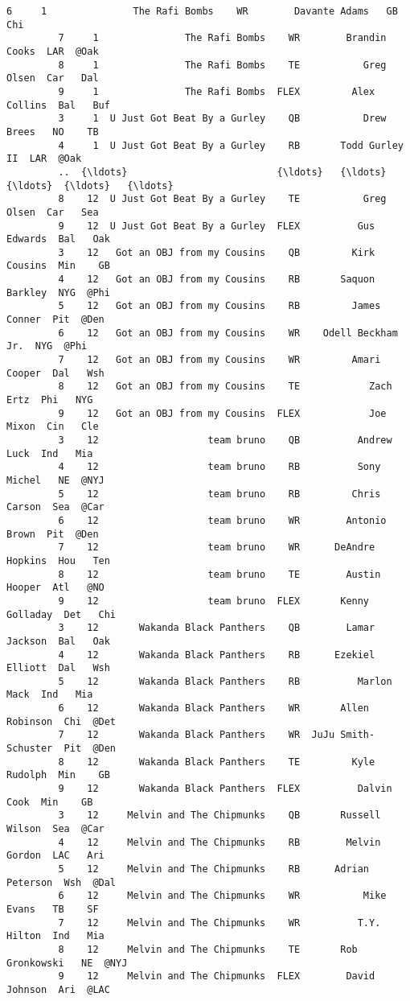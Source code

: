 \documentclass[11pt]{article}
\begin{document}
\begin{Verbatim}[commandchars=\\\{\}]
         6     1               The Rafi Bombs    WR        Davante Adams   GB   Chi   
         7     1               The Rafi Bombs    WR        Brandin Cooks  LAR  @Oak   
         8     1               The Rafi Bombs    TE           Greg Olsen  Car   Dal   
         9     1               The Rafi Bombs  FLEX         Alex Collins  Bal   Buf   
         3     1  U Just Got Beat By a Gurley    QB           Drew Brees   NO    TB   
         4     1  U Just Got Beat By a Gurley    RB       Todd Gurley II  LAR  @Oak   
         ..  {\ldots}                          {\ldots}   {\ldots}                  {\ldots}  {\ldots}   {\ldots}   
         8    12  U Just Got Beat By a Gurley    TE           Greg Olsen  Car   Sea   
         9    12  U Just Got Beat By a Gurley  FLEX          Gus Edwards  Bal   Oak   
         3    12   Got an OBJ from my Cousins    QB         Kirk Cousins  Min    GB   
         4    12   Got an OBJ from my Cousins    RB       Saquon Barkley  NYG  @Phi   
         5    12   Got an OBJ from my Cousins    RB         James Conner  Pit  @Den   
         6    12   Got an OBJ from my Cousins    WR    Odell Beckham Jr.  NYG  @Phi   
         7    12   Got an OBJ from my Cousins    WR         Amari Cooper  Dal   Wsh   
         8    12   Got an OBJ from my Cousins    TE            Zach Ertz  Phi   NYG   
         9    12   Got an OBJ from my Cousins  FLEX            Joe Mixon  Cin   Cle   
         3    12                   team bruno    QB          Andrew Luck  Ind   Mia   
         4    12                   team bruno    RB          Sony Michel   NE  @NYJ   
         5    12                   team bruno    RB         Chris Carson  Sea  @Car   
         6    12                   team bruno    WR        Antonio Brown  Pit  @Den   
         7    12                   team bruno    WR      DeAndre Hopkins  Hou   Ten   
         8    12                   team bruno    TE        Austin Hooper  Atl   @NO   
         9    12                   team bruno  FLEX       Kenny Golladay  Det   Chi   
         3    12       Wakanda Black Panthers    QB        Lamar Jackson  Bal   Oak   
         4    12       Wakanda Black Panthers    RB      Ezekiel Elliott  Dal   Wsh   
         5    12       Wakanda Black Panthers    RB          Marlon Mack  Ind   Mia   
         6    12       Wakanda Black Panthers    WR       Allen Robinson  Chi  @Det   
         7    12       Wakanda Black Panthers    WR  JuJu Smith-Schuster  Pit  @Den   
         8    12       Wakanda Black Panthers    TE         Kyle Rudolph  Min    GB   
         9    12       Wakanda Black Panthers  FLEX          Dalvin Cook  Min    GB   
         3    12     Melvin and The Chipmunks    QB       Russell Wilson  Sea  @Car   
         4    12     Melvin and The Chipmunks    RB        Melvin Gordon  LAC   Ari   
         5    12     Melvin and The Chipmunks    RB      Adrian Peterson  Wsh  @Dal   
         6    12     Melvin and The Chipmunks    WR           Mike Evans   TB    SF   
         7    12     Melvin and The Chipmunks    WR          T.Y. Hilton  Ind   Mia   
         8    12     Melvin and The Chipmunks    TE       Rob Gronkowski   NE  @NYJ   
         9    12     Melvin and The Chipmunks  FLEX        David Johnson  Ari  @LAC   
         

\end{Verbatim}
\end{document}
